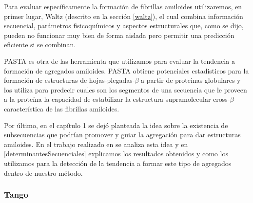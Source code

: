 Para evaluar específicamente la formación de fibrillas amiloides utilizaremos, en primer lugar, Waltz (descrito en la sección \ref{waltz}),
el cual combina información secuencial, parámetros fisicoquímicos y aspectos estructurales que, como se dijo, pueden no funcionar muy bien de forma aislada pero permitir una predicción eficiente si se combinan.


PASTA es otra de las herramienta que utilizamos para evaluar la tendencia a formación de agregados amiloides. 
PASTA obtiene potenciales estadisticos para la formación de estructuras de hojas-plegadas-$\beta$ a partir de proteinas globulares y los utiliza para
predecir cuales son los segmentos de una secuencia que le proveen a la proteína la capacidad de estabilizar la estructura supramolecular cross-$\beta$ característica de las fibrillas amiloides.

Por último, en el capítulo 1 se dejó planteada la idea sobre la existencia de subsecuencias que podrían promover y guiar la agregación para dar estructuras amiloides.
En el trabajo realizado en \cite{de2004sequence} se analiza esta idea y en \ref{determinantesSecuenciales} explicamos los resultados obtenidos y como los utilizamos para la detección 
de la tendencia a formar este tipo de agregados dentro de nuestro método.





























\subsubsection{Tango}\label{tango}


